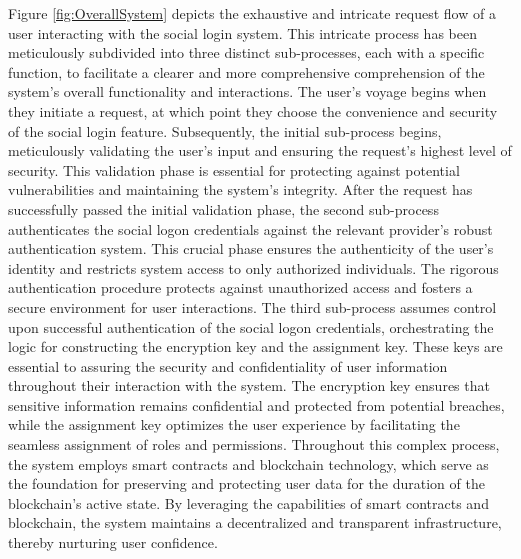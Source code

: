 \documentclass[../Main.tex]{subfiles}
\begin{document}
Figure \ref{fig:OverallSystem} depicts the exhaustive and intricate request flow of a user interacting with the social login system. This intricate process has been meticulously subdivided into three distinct sub-processes, each with a specific function, to facilitate a clearer and more comprehensive comprehension of the system's overall functionality and interactions. The user's voyage begins when they initiate a request, at which point they choose the convenience and security of the social login feature. Subsequently, the initial sub-process begins, meticulously validating the user's input and ensuring the request's highest level of security. This validation phase is essential for protecting against potential vulnerabilities and maintaining the system's integrity. After the request has successfully passed the initial validation phase, the second sub-process authenticates the social logon credentials against the relevant provider's robust authentication system. This crucial phase ensures the authenticity of the user's identity and restricts system access to only authorized individuals. The rigorous authentication procedure protects against unauthorized access and fosters a secure environment for user interactions. The third sub-process assumes control upon successful authentication of the social logon credentials, orchestrating the logic for constructing the encryption key and the assignment key. These keys are essential to assuring the security and confidentiality of user information throughout their interaction with the system. The encryption key ensures that sensitive information remains confidential and protected from potential breaches, while the assignment key optimizes the user experience by facilitating the seamless assignment of roles and permissions. Throughout this complex process, the system employs smart contracts and blockchain technology, which serve as the foundation for preserving and protecting user data for the duration of the blockchain's active state. By leveraging the capabilities of smart contracts and blockchain, the system maintains a decentralized and transparent infrastructure, thereby nurturing user confidence.
\end{document}
